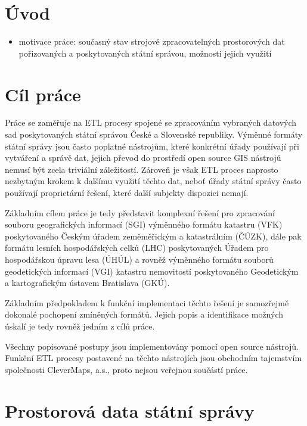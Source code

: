 \HlavickaUvod
{} \chapter*{Úvod}

\begin{itemize}

\item
  motivace práce: současný stav strojově zpracovatelných prostorových
  dat pořizovaných a poskytovaných státní správou, možnosti jejich
  využití
\end{itemize}

\cleardoublepage
\HlavickaKapitoly
\setcounter{page}{1}  \chapter{Cíl práce}

Práce se zaměřuje na ETL procesy spojené se zpracováním vybraných
datových sad poskytovaných státní správou České a Slovenské republiky.
Výměnné formáty státní správy jsou často poplatné nástrojům, které
konkrétní úřady používají při vytváření a správě dat, jejich převod do
prostředí open source GIS nástrojů nemusí být zcela triviální
záležitostí. Zároveň je však ETL proces naprosto nezbytným krokem k
dalšímu využití těchto dat, neboť úřady státní správy často používají
proprietární řešení, které další subjekty dispozici nemají.

Základním cílem práce je tedy představit komplexní řešení pro zpracování
souboru geografických informací (SGI) výměnného formátu katastru (VFK)
poskytovaného Českým úřadem zeměměřickým a katastrálním (ČÚZK), dále pak
formátu lesních hospodářských celků (LHC) poskytovaných Úřadem pro
hospodářskou úpravu lesa (ÚHÚL) a rovněž výměnného formátu souborů
geodetických informací (VGI) katastru nemovitostí poskytovaného
Geodetickým a kartografickým ústavem Bratislava (GKÚ).

Základním předpokladem k funkční implementaci těchto řešení je
samozřejmě dokonalé pochopení zmíněných formátů. Jejich popis a
identifikace možných úskalí je tedy rovněž jedním z cílů práce.

Všechny popisované postupy jsou implementovány pomocí open source
nástrojů. Funkční ETL procesy postavené na těchto nástrojích jsou
obchodním tajemstvím společnosti CleverMaps, a.s., proto nejsou veřejnou
součástí práce.
\chapter{Prostorová data státní správy}

